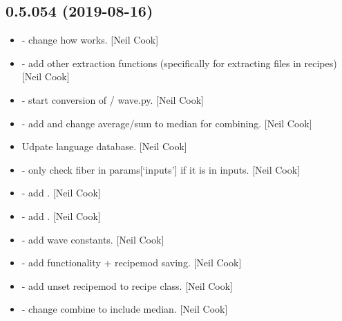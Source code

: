 \documentclass[a4paper,10pt,english]{report}
\begin{document}
\subsection{0.5.054 (2019-08-16)}
\label{\detokenize{misc/changelog:id88}}\begin{itemize}
\item {} 
 - change how  works.
{[}Neil Cook{]}

\item {} 
 - add other extraction functions
(specifically for extracting files in recipes) {[}Neil Cook{]}

\item {} 
 - start conversion of  /
wave.py. {[}Neil Cook{]}

\item {} 
 - add  and change average/sum to median
for combining. {[}Neil Cook{]}

\item {} 
Udpate language database. {[}Neil Cook{]}

\item {} 
 - only check fiber in params{[}‘inputs’{]} if it is in
inputs. {[}Neil Cook{]}

\item {} 
 - add . {[}Neil Cook{]}

\item {} 
 - add . {[}Neil Cook{]}

\item {} 
 - add wave constants. {[}Neil
Cook{]}

\item {} 
 - add  functionality + recipemod
saving. {[}Neil Cook{]}

\item {} 
 - add unset recipemod to recipe class. {[}Neil
Cook{]}

\item {} 
 - change combine to include median. {[}Neil Cook{]}


\end{itemize}
\end{document}
